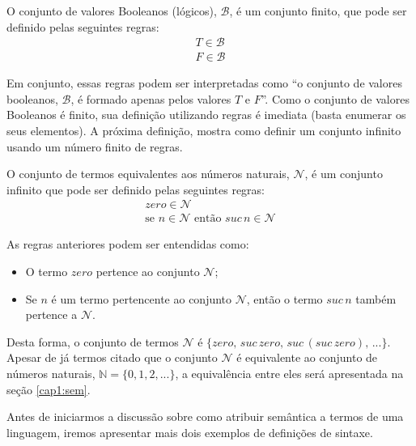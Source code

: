 \begin{Definition}
  O conjunto de valores Booleanos (l\'ogicos), $\mathcal{B}$, \'e um conjunto finito, que pode ser definido pelas seguintes regras:
  \[
      \begin{array}{l}
        T \in\mathcal{B}\\
        F \in\mathcal{B}
      \end{array}
  \]
\end{Definition}

Em conjunto, essas regras podem ser interpretadas como ``o conjunto de valores booleanos, $\mathcal{B}$, \'e formado apenas pelos valores 
$T$ e $F$''.
Como o conjunto de valores Booleanos \'e finito, sua defini\c{c}\~ao utilizando regras \'e imediata (basta enumerar os seus elementos). 
A pr\'oxima defini\c{c}\~ao, mostra como definir um conjunto infinito usando um n\'umero finito de regras.

\begin{Definition}
O conjunto de termos equivalentes aos n\'umeros naturais, $\mathcal{N}$, \'e um conjunto infinito que pode ser definido pelas seguintes regras:
\[
   \begin{array}{l}
     zero \in \mathcal{N}\\
     \text{se }n \in \mathcal{N} \text{ ent\~ao }suc\,n\in\mathcal{N}
   \end{array}
\]
\end{Definition}

As regras anteriores podem ser entendidas como:
\begin{itemize}
  \item O termo $zero$ pertence ao conjunto $\mathcal{N}$;
  \item Se $n$ \'e um termo pertencente ao conjunto $\mathcal{N}$, ent\~ao o termo $suc\,n$ tamb\'em pertence a $\mathcal{N}$.
\end{itemize}
Desta forma, o conjunto de termos $\mathcal{N}$ \'e $\{zero,\,suc\,zero,\,suc\,(suc\,zero),\,...\}$. 
Apesar de j\'a termos citado que o conjunto $\mathcal{N}$ \'e equivalente ao conjunto de n\'umeros naturais, $\mathbb{N} = \{0,1,2,...\}$, 
a equival\^encia entre eles ser\'a apresentada na se\c{c}\~ao \ref{cap1:sem}.

Antes de iniciarmos a discuss\~ao sobre como atribuir sem\^antica a termos de uma linguagem, iremos apresentar mais dois exemplos de 
defini\c{c}\~oes de sintaxe.

